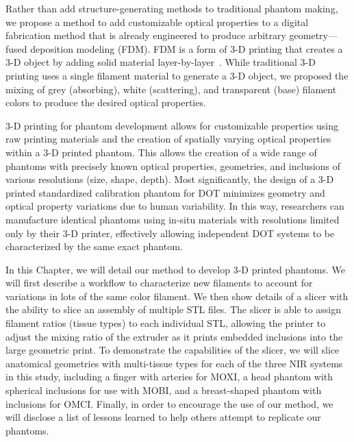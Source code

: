 Rather than add structure-generating methods to traditional phantom making, we propose a method to add customizable optical properties to a digital fabrication method that is already engineered to produce arbitrary geometry---fused deposition modeling (FDM). FDM is a form of 3-D printing that creates a 3-D object by adding solid material layer-by-layer~\cite{Dong2015}. While traditional 3-D printing uses a single filament material to generate a 3-D object, we proposed the mixing of grey (absorbing), white (scattering), and transparent (base) filament colors to produce the desired optical properties. 

3-D printing for phantom development allows for customizable properties using raw printing materials and the creation of spatially varying optical properties within a 3-D printed phantom. This allows the creation of a wide range of phantoms with precisely known optical properties, geometries, and inclusions of various resolutions (size, shape, depth). Most significantly, the design of a 3-D printed standardized calibration phantom for DOT minimizes geometry and optical property variations due to human variability. In this way, researchers can manufacture identical phantoms using in-situ materials with resolutions limited only by their 3-D printer, effectively allowing independent DOT systems to be characterized by the same exact phantom. 

In this Chapter, we will detail our method to develop 3-D printed phantoms. We will first describe a workflow to characterize new filaments to account for variations in lots of the same color filament. We then show details of a slicer with the ability to slice an assembly of multiple STL files. The slicer is able to assign filament ratios (tissue types) to each individual STL, allowing the printer to adjust the mixing ratio of the extruder as it prints embedded inclusions into the large geometric print. To demonstrate the capabilities of the slicer, we will slice anatomical geometries with multi-tissue types for each of the three NIR systems in this study, including a finger with arteries for MOXI, a head phantom with spherical inclusions for use with MOBI, and a breast-shaped phantom with inclusions for OMCI. Finally, in order to encourage the use of our method, we will disclose a list of lessons learned to help others attempt to replicate our phantoms. 



